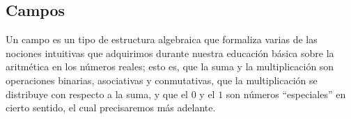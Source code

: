 \documentclass[notasLineal]{subfiles}
\begin{document}

    
%

\subsection*{Campos} \label{Ssec: Campos}

Un campo es un tipo de estructura algebraica que formaliza varias de las nociones intuitivas que adquirimos durante nuestra educación básica sobre la aritmética en los números reales; esto es, que la suma y la multiplicación son operaciones binarias, asociativas y conmutativas, que la multiplicación se distribuye con respecto a la suma, y que el $0$ y el $1$ son números ``especiales'' en cierto sentido, el cual precisaremos más adelante. \\
\end{document}

